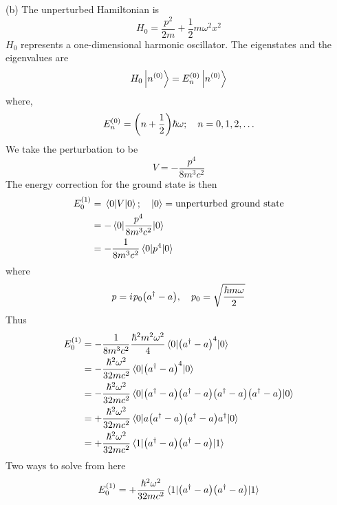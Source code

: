 \begin{enumerate}[label=Problem.\arabic*,start=1]
			
			(b) The unperturbed Hamiltonian is
			\begin{equation}
				H_0 = \frac{p^2}{2 m} + \frac{1}{2} m \omega^2 x^2
			\end{equation}
			$H_0$ represents a one-dimensional harmonic oscillator. The eigenstates and the eigenvalues are 
			\begin{equation*}
				H_0 \ket{n^{(0)}} = E_n^{(0)} \ket{n^{(0)}}
			\end{equation*}
			where,
			\begin{equation*}
				E_n^{(0)} = \qty(n + \frac{1}{2}) \hbar \omega; \quad n=0,1,2,\ldots
			\end{equation*}
			We take the perturbation to be
			\begin{equation*}
				V = - \frac{p^4}{8 m^3 c^2}
			\end{equation*}
			The energy correction for the ground state is then
			\begin{align*}
				E_0^{(1)} 
				&= \expval{V}{0};\quad \ket{0} = \text{unperturbed ground state}\\
				&= - \expval{\frac{p^4}{8 m^3 c^2}}{0} \\
				&= - \frac{1}{8 m^3 c^2} \expval{p^4}{0}
			\end{align*}
			where
			\begin{equation*}
				p = {i\mkern1mu} p_0 \qty(a^{\dagger} - a),\quad p_0 = \sqrt{\frac{\hbar m \omega}{2}}
			\end{equation*}
			Thus
			\begin{align*}
				E_0^{(1)} 
				&= - \frac{1}{8 m^3 c^2} \frac{\hbar^2 m^2 \omega^2}{4} \expval{\qty(a^{\dagger} - a)^4}{0} \\
				&= - \frac{\hbar^2 \omega^2}{32 m c^2} \expval{\qty(a^{\dagger} - a)^4}{0} \\
				&= - \frac{\hbar^2 \omega^2}{32 m c^2} \expval{\qty(a^{\dagger} - a)\qty(a^{\dagger} - a)\qty(a^{\dagger} - a)\qty(a^{\dagger} - a)}{0} \\
				&= + \frac{\hbar^2 \omega^2}{32 m c^2} \expval{a\qty(a^{\dagger} - a)\qty(a^{\dagger} - a)a^{\dagger}}{0} \\
				&= + \frac{\hbar^2 \omega^2}{32 m c^2} \expval{\qty(a^{\dagger} - a)\qty(a^{\dagger} - a)}{1} \\
			\end{align*}
			Two ways to solve from here
			\begin{align*}
				E_0^{(1)}  
				&= + \frac{\hbar^2 \omega^2}{32 m c^2} \expval{\qty(a^{\dagger} - a)\qty(a^{\dagger} - a)}{1} \\

\end{align*}
\end{enumerate}
